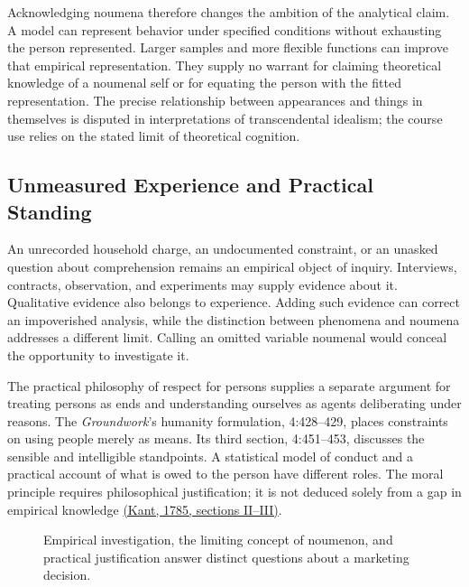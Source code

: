Acknowledging noumena therefore changes the ambition of the analytical
claim. A model can represent behavior under specified conditions without
exhausting the person represented. Larger samples and more flexible
functions can improve that empirical representation. They supply no
warrant for claiming theoretical knowledge of a noumenal self or for
equating the person with the fitted representation. The precise
relationship between appearances and things in themselves is disputed in
interpretations of transcendental idealism; the course use relies on the
stated limit of theoretical cognition.

\hypertarget{M09-unmeasured-experience-and-practical-standing}{%
\subsection{Unmeasured Experience and Practical
Standing}\label{M09-unmeasured-experience-and-practical-standing}}

\noindent \noindent An unrecorded household charge, an undocumented constraint, or
an unasked question about comprehension remains an empirical object of
inquiry. Interviews, contracts, observation, and experiments may supply
evidence about it. Qualitative evidence also belongs to experience.
Adding such evidence can correct an impoverished analysis, while the
distinction between phenomena and noumena addresses a different limit.
Calling an omitted variable noumenal would conceal the opportunity to
investigate it.

The practical philosophy of respect for persons supplies a separate
argument for treating persons as ends and understanding ourselves as
agents deliberating under reasons. The \emph{Groundwork}'s humanity
formulation, 4:428--429, places constraints on using people merely as
means. Its third section, 4:451--453, discusses the sensible and
intelligible standpoints. A statistical model of conduct and a practical
account of what is owed to the person have different roles. The moral
principle requires philosophical justification; it is not deduced solely
from a gap in empirical knowledge
\href{../01_Resources/15_Marketing_Dialectics/01_Kant_Primary_Texts/public_domain_texts/Kant_Groundwork_Abbott.html}{(Kant,
1785, sections II--III)}.

\begin{figure}[htbp]
\centering

\caption{Empirical investigation, the limiting concept of noumenon, and practical justification answer distinct questions about a marketing decision.}\label{fig:M09_phenomena_noumena}
\end{figure}

